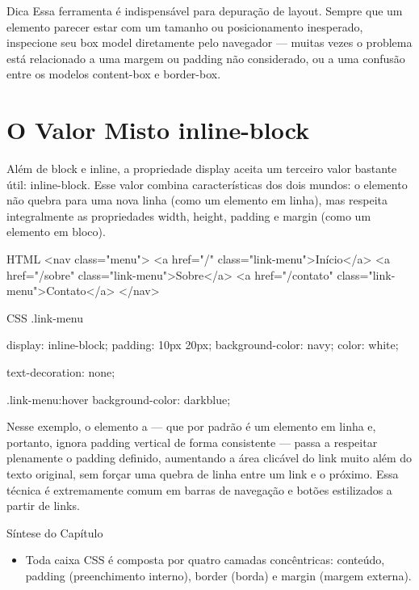 \begin{infobox}{Dica}
Essa ferramenta é indispensável para depuração de layout. Sempre que um elemento parecer estar com um tamanho ou posicionamento inesperado, inspecione seu box model diretamente pelo navegador — muitas vezes o problema está relacionado a uma margem ou padding não considerado, ou a uma confusão entre os modelos content-box e border-box.
\end{infobox}

\section{O Valor Misto inline-block}

Além de block e inline, a propriedade display aceita um terceiro valor bastante útil: inline-block. Esse valor combina características dos dois mundos: o elemento não quebra para uma nova linha (como um elemento em linha), mas respeita integralmente as propriedades width, height, padding e margin (como um elemento em bloco).

\begin{codebox}{HTML}
<nav class="menu">
  <a href="/" class="link-menu">Início</a>
  <a href="/sobre" class="link-menu">Sobre</a>
  <a href="/contato" class="link-menu">Contato</a>
</nav>
\end{codebox}

\begin{codebox}{CSS}
.link-menu {
  display: inline-block;
  padding: 10px 20px;
  background-color: navy;
  color: white;



    text-decoration: none;
}

.link-menu:hover {
  background-color: darkblue;
}
\end{codebox}

Nesse exemplo, o elemento a — que por padrão é um elemento em linha e, portanto, ignora padding vertical de forma consistente — passa a respeitar plenamente o padding definido, aumentando a área clicável do link muito além do texto original, sem forçar uma quebra de linha entre um link e o próximo. Essa técnica é extremamente comum em barras de navegação e botões estilizados a partir de links.

Síntese do Capítulo

\begin{itemize}
  \item Toda caixa CSS é composta por quatro camadas concêntricas: conteúdo, padding (preenchimento interno), border (borda) e margin (margem externa).
\end{itemize}

